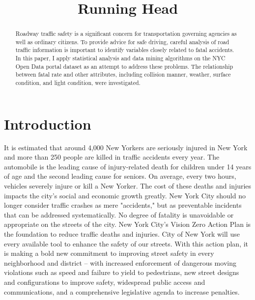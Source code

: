 \documentclass[conference]{IEEEtran}
\begin{document}
%
\title{Running Head}


\author{
}



\maketitle{}

\begin{abstract}
Roadway traffic safety is a significant concern for transportation governing agencies as well as ordinary citizens.  To provide advice for safe driving, careful analysis of road traffic information is important to identify variables closely related to fatal accidents.  In this paper, I apply statistical analysis and data mining algorithms on the NYC Open Data portal dataset as an attempt to address these problems. The relationship between fatal rate and other attributes, including collision manner, weather, surface condition, and light condition, were investigated.
\end{abstract}

\section{Introduction}
\label{sec:introduction}

It is estimated that around 4,000 New Yorkers are seriously injured in New York and more than 250 people are killed in traffic accidents every year. The automobile is the leading cause of injury-related death for children under 14 years of age and the second leading cause for seniors. On average, every two hours, vehicles severely injure or kill a New Yorker. The cost of these deaths and injuries impacts the city's social and economic growth greatly.  New York City should no longer consider traffic crashes as mere "accidents," but as preventable incidents that can be addressed systematically. No degree of fatality is unavoidable or appropriate on the streets of the city. New York City's Vision Zero Action Plan\cite{VisionZero} is the foundation to reduce traffic deaths and injuries. City of New York will use every available tool to enhance the safety of our streets. With this action plan, it is making a bold new commitment to improving street safety in every neighborhood and district – with increased enforcement of dangerous moving violations such as speed and failure to yield to pedestrians, new street designs and configurations to improve safety, widespread public access and communications, and a comprehensive legislative agenda to increase penalties. 
\end{document}
